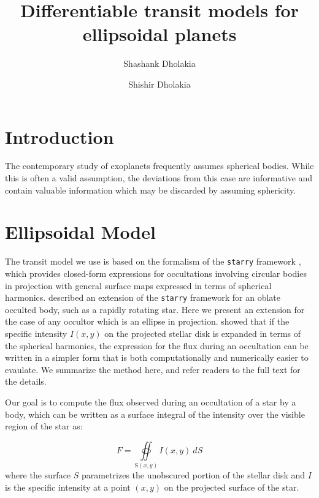 \documentclass[twocolumn]{aastex631}
\begin{document}
\title{Differentiable transit models for ellipsoidal planets}

\author{Shashank Dholakia} \author{Shishir Dholakia}

\begin{abstract}

\end{abstract}

\section{Introduction}
The contemporary study of exoplanets frequently assumes spherical bodies. While this is often a valid assumption, the deviations from this case are informative and contain valuable information which may be discarded by assuming sphericity.
\label{sec:intro}

\section{Ellipsoidal Model}
\label{sec:model}
The transit model we use is based on the formalism of the \texttt{starry} framework \citep{starry2019}, which provides closed-form expressions for occultations involving circular bodies in projection with general surface maps expressed in terms of spherical harmonics. \citet{dholakia2022} described an extension of the \texttt{starry} framework for an oblate occulted body, such as a rapidly rotating star. Here we present an extension for the case of any occultor which is an ellipse in projection. \citet{starry2019} showed that if the specific intensity $I(x,y)$ on the projected stellar disk is expanded in terms of the spherical harmonics, the expression for the flux during an occultation can be written in a simpler form that is both computationally and numerically easier to evaulate. We summarize the method here, and refer readers to the full text for the details. 

Our goal is to compute the flux observed during an occultation of a star by a body, which can be written as a surface integral of the intensity over the visible region of the star as:

\begin{equation}
   F = \oiint\limits_{\mathrm{S}(x,y)} I(x,y) \ dS
\end{equation}
where the surface $S$ parametrizes the unobscured portion of the stellar disk and $I$ is the specific intensity at a point $(x,y)$ on the projected surface of the star.
\end{document}

